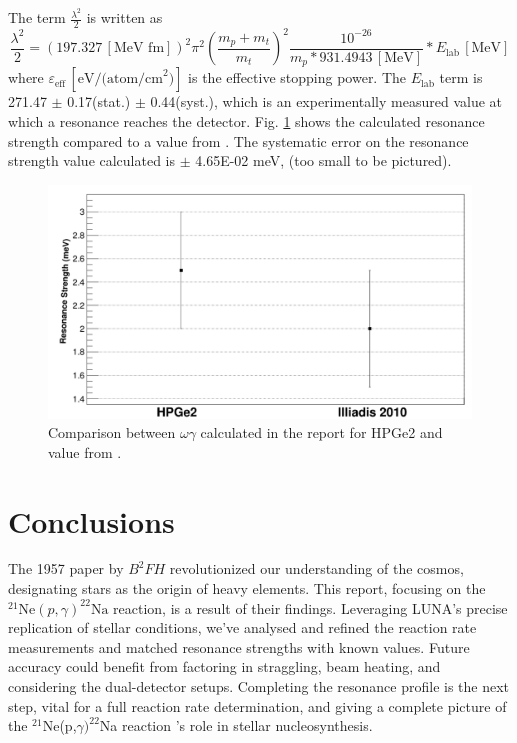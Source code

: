 \documentclass[a4paper,12pt]{article}
\def\reac{$^{21}$Ne(p,$\gamma)^{22}$Na reaction }
\begin{document}
The term \( \frac{\lambda^2}{2} \) is written as
\begin{equation}
\frac{\lambda^2}{2} = \left(197.327 \, [\text{MeV fm}]\right)^2 \pi^2 \left(\frac{m_p + m_t}{m_t}\right)^2 \frac{10^{-26}}{m_p \ast 931.4943 \, [\text{MeV}]} \ast E_{\text{lab}} \, [\text{MeV}]
\end{equation}
where \( \varepsilon_{\text{eff}} \, [\text{eV/(atom/cm}^2)]\) is the effective stopping power.  The $E_{\text{lab}}$ term is 271.47	$\pm$ 0.17(stat.) $\pm$ 0.44(syst.), which is an experimentally measured value at which a resonance reaches the detector.  Fig. \ref{fig:res} shows the calculated resonance strength compared to a value from \cite{Iliadis2010}.  The systematic error on the resonance strength value calculated is $\pm$ 4.65E-02 meV, (too small to be pictured).

\begin{figure}[H]
    \centering
    \hspace{-1cm}
    \includegraphics[width=12cm]{res.png}
    \caption{Comparison between $\omega\gamma$ calculated in the report for HPGe2 and value from \cite{Iliadis2010}. }
    \label{fig:res}
\end{figure}



\section{Conclusions}

The 1957 paper by $B^2FH$ revolutionized our understanding of the cosmos, designating stars as the origin of heavy elements. This report, focusing on the \(^{21}\text{Ne}(p,\gamma)^{22}\text{Na}\) reaction, is a result of their findings. Leveraging LUNA's precise replication of stellar conditions, we've analysed and refined the reaction rate measurements and matched resonance strengths with known values. Future accuracy could benefit from factoring in straggling, beam heating, and considering the dual-detector setups. Completing the resonance profile is the next step, vital for a full reaction rate determination, and giving a complete picture of the \reac's role in stellar nucleosynthesis.



\end{document}
